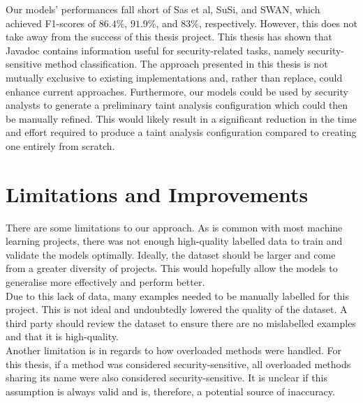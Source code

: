 \noindent
Our models' performances fall short of Sas et al, SuSi, and SWAN, which achieved F1-scores of $86.4\%$, $91.9\%$, and $83\%$, respectively. However, this does not take away from the success of this thesis project. This thesis has shown that Javadoc contains information useful for security-related tasks, namely security-sensitive method classification. The approach presented in this thesis is not mutually exclusive to existing implementations and, rather than replace, could enhance current approaches. Furthermore, our models could be used by security analysts to generate a preliminary taint analysis configuration which could then be manually refined. This would likely result in a significant reduction in the time and effort required to produce a taint analysis configuration compared to creating one entirely from scratch. 

\section{Limitations and Improvements}
\label{limitations_and_improvements}

\noindent
There are some limitations to our approach. As is common with most machine learning projects, there was not enough high-quality labelled data to train and validate the models optimally. Ideally, the dataset should be larger and come from a greater diversity of projects. This would hopefully allow the models to generalise more effectively and perform better.\\

\noindent
Due to this lack of data, many examples needed to be manually labelled for this project. This is not ideal and undoubtedly lowered the quality of the dataset. A third party should review the dataset to ensure there are no mislabelled examples and that it is high-quality.\\

\noindent
Another limitation is in regards to how overloaded methods were handled. For this thesis, if a method was considered security-sensitive, all overloaded methods sharing its name were also considered security-sensitive. It is unclear if this assumption is always valid and is, therefore, a potential source of inaccuracy. \\